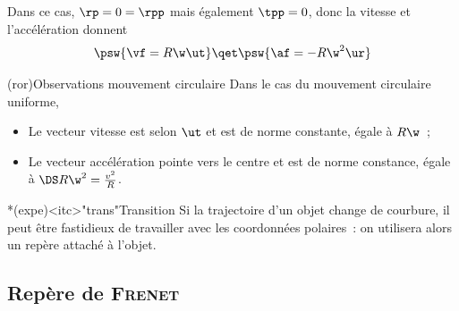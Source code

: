 \documentclass[../../main/main.tex]{subfiles}
\begin{document}
Dans ce cas, $\rp = 0 = \rpp$ mais également $\tpp = 0$, donc la vitesse et
l'accélération donnent
\[
	\psw{\vf = R\w\ut}
	\qet
	\psw{\af = -R\w^2\ur}
\]

\begin{tcb*}(ror){Observations mouvement circulaire}
	Dans le cas du mouvement circulaire uniforme,
	\begin{itemize}
		\item Le vecteur vitesse est selon $\ut$ et est de norme constante,
		      égale à $R\w$~;
		\item Le vecteur accélération pointe vers le centre et est de norme
		      constance, égale à $\DS R\w^2 = \frac{v^2}{R}$.
	\end{itemize}
\end{tcb*}

\begin{tcb}*(expe)<itc>"trans"{Transition}
	Si la trajectoire d'un objet change de courbure, il peut être fastidieux de
	travailler avec les coordonnées polaires~: on utilisera alors un repère
	attaché à l'objet.
\end{tcb}

\subsection{Repère de \textsc{Frenet}}
\end{document}
